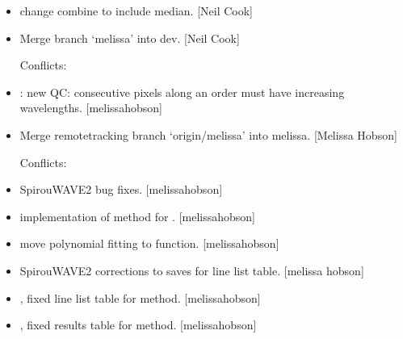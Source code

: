 \documentclass[a4paper,10pt,english]{report}
\begin{document}
\begin{itemize}
\item {} 
 \sphinxhyphen{} change combine to include median. {[}Neil Cook{]}

\item {} 
Merge branch ‘melissa’ into dev. {[}Neil Cook{]}
\begin{description}
\item[{Conflicts:}] \leavevmode
{}

\end{description}

\item {} 
: new QC: consecutive pixels along an order must have
increasing wavelengths. {[}melissa\sphinxhyphen{}hobson{]}

\item {} 
Merge remote\sphinxhyphen{}tracking branch ‘origin/melissa’ into melissa. {[}Melissa
Hobson{]}
\begin{description}
\item[{Conflicts:}] \leavevmode
{}

\end{description}

\item {} 
SpirouWAVE2 \sphinxhyphen{} bug fixes. {[}melissa\sphinxhyphen{}hobson{]}

\item {} 
 \sphinxhyphen{} implementation of  method for
. {[}melissa\sphinxhyphen{}hobson{]}

\item {} 
 \sphinxhyphen{} move polynomial fitting to function. {[}melissa\sphinxhyphen{}hobson{]}

\item {} 
SpirouWAVE2 \sphinxhyphen{} corrections to saves for line list table. {[}melissa\sphinxhyphen{}
hobson{]}

\item {} 
,  \sphinxhyphen{} fixed line list table for 
method. {[}melissa\sphinxhyphen{}hobson{]}

\item {} 
,  \sphinxhyphen{} fixed results table for 
method. {[}melissa\sphinxhyphen{}hobson{]}


\end{itemize}
\end{document}
